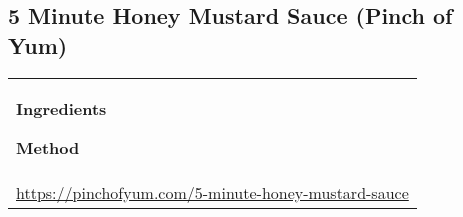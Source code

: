 \documentclass[../web-recipes.tex]{subfiles}
\begin{document}
    \renewcommand{\mytitle}{5 Minute Honey Mustard Sauce (Pinch of Yum)} %
    \renewcommand{\myurl}{https://pinchofyum.com/5-minute-honey-mustard-sauce} %

    \begin{mdframed}[nobreak]
      \section{\mytitle}
      \begin{tabular}{l}
        \begin{minipage}[t]{0.35\textwidth}
          {\sffamily\bfseries Ingredients}\vspace{0.5ex}
          
        \end{minipage}
        \qquad
        \begin{minipage}[t]{0.55\textwidth}
          {\sffamily\bfseries Method}\vspace{0.5ex}
          
        \end{minipage} \vspace{3ex}\\
        \multicolumn{1}{c}{\small\ttfamily \url{\myurl}} \\
      \end{tabular}
    \end{mdframed}
    
\end{document}
